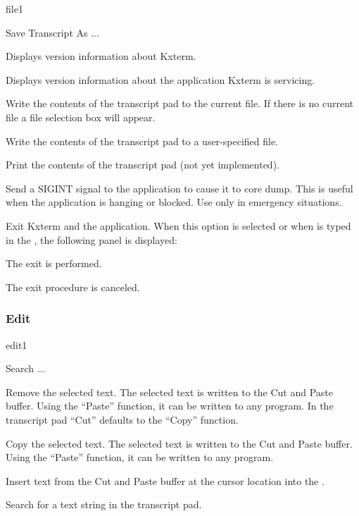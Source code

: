 \begin{PAWf}{file1}
\begin{DLsf}{Save Transcript As ...}
\item[About Kxterm...]
         Displays version information about Kxterm.
\item[About <Application>...]
         Displays version information about the application
         Kxterm is servicing.
\item[Save Transcript]
         Write the contents of the transcript pad to the current
         file. If there is no current file a file selection box
         will appear.
\item[Save Transcript As...]
         Write the contents of the transcript pad to a user-specified
         file.
\item[Print...]
         Print the contents of the transcript pad (not yet implemented).
\item[Kill]
         Send a SIGINT signal to the application to cause it to
         core dump. This is useful when the application is hanging or
         blocked. Use only in emergency situations.
\item[Exit]
         Exit Kxterm and the application. When this option is selected
         or when  is typed in the \IP, the following panel is 
         displayed:
\end{DLsf}
\end{PAWf}

\begin{EnumZB}
\item  The exit is performed.
\item  The exit procedure is canceled.
\end{EnumZB}

\subsubsection{Edit}
\begin{PAWf}{edit1}
\begin{DLsf}{Search ...}
\item[Cut]
         Remove the selected text. The selected text is written to the
         Cut and Paste buffer. Using the ``Paste'' function, it can be
         written to any \Xxi program. In the transcript pad ``Cut''
         defaults to the ``Copy'' function.
\item[Copy]
         Copy the selected text. The selected text is written to the
         Cut and Paste buffer. Using the ``Paste'' function, it can be
         written to any \Xxi program.
\item[Paste]
         Insert text from the Cut and Paste buffer at the cursor location
         into the \IP.
\item[Search...]
         Search for a text string in the transcript pad.
\end{DLsf}
\end{PAWf}

